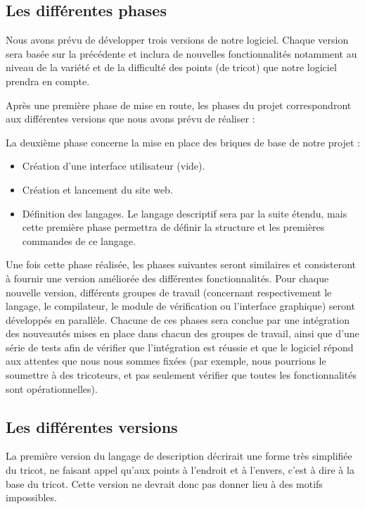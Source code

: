\documentclass{article}
\begin{document}
\subsection{Les différentes phases}

Nous avons prévu de développer trois versions de notre logiciel. Chaque version sera basée sur la précédente et inclura de nouvelles
fonctionnalités notamment au niveau de la variété et de la difficulté des points (de tricot) que notre logiciel prendra en compte. \newline

Après une première phase de mise en route, les phases du projet correspondront aux différentes versions que nous avons prévu de réaliser :

La deuxième phase concerne la mise en place des briques de base de notre projet :
    \begin{itemize}
     \item Création d'une interface utilisateur (vide).
     \item Création et lancement du site web.
     \item Définition des langages. Le langage descriptif sera par la suite étendu, mais cette première phase permettra de définir la
structure et les premières commandes de ce langage.
    \end{itemize}

Une fois cette phase réalisée, les phases suivantes seront similaires et consisteront à fournir une version améliorée des
différentes fonctionnalités. Pour chaque nouvelle version, différents groupes de travail (concernant respectivement le langage, le
compilateur, le module de vérification ou l'interface graphique) seront développés en parallèle. Chacune de ces phases sera conclue
par une intégration des nouveautés mises en place dans chacun des groupes de travail, ainsi que d'une série de tests afin de vérifier que
l'intégration est réussie et que le logiciel répond aux attentes que nous nous sommes fixées (par exemple, nous pourrions le soumettre
à des tricoteurs, et pas seulement vérifier que toutes les fonctionnalités sont opérationnelles).


\subsection{Les différentes versions}

La première version du langage de description décrirait une forme très simplifiée du tricot, ne faisant appel qu'aux points à l'endroit
et à l'envers, c'est à dire à la base du tricot. Cette version ne devrait donc pas donner lieu à des motifs impossibles.
\end{document}
